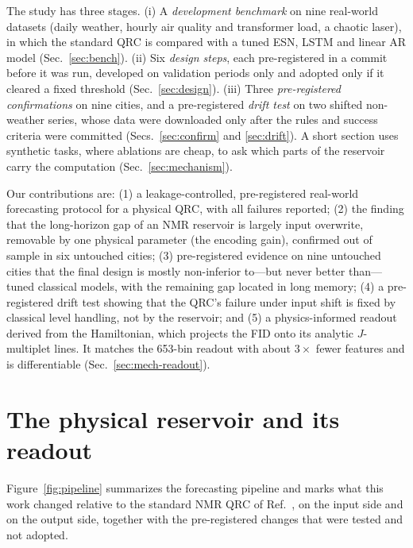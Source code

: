 \documentclass[aps,prresearch,preprint,superscriptaddress,amsmath,amssymb,floatfix]{revtex4-2}
\begin{document}
The study has three stages. (i) A \emph{development benchmark} on nine real-world
datasets (daily weather, hourly air quality and transformer load, a chaotic laser),
in which the standard QRC is compared with a tuned ESN, LSTM and linear AR model
(Sec.~\ref{sec:bench}). (ii) Six \emph{design steps}, each pre-registered in a
commit before it was run, developed on validation periods only and adopted only if it
cleared a fixed threshold (Sec.~\ref{sec:design}). (iii) Three \emph{pre-registered
confirmations} on nine cities, and a pre-registered \emph{drift test} on two shifted
non-weather series, whose data were downloaded only after the rules and success
criteria were committed (Secs.~\ref{sec:confirm} and \ref{sec:drift}). A short
section uses synthetic tasks, where ablations are cheap, to ask which parts of the
reservoir carry the computation (Sec.~\ref{sec:mechanism}).

Our contributions are: (1) a leakage-controlled, pre-registered real-world
forecasting protocol for a physical QRC, with all failures reported; (2) the finding
that the long-horizon gap of an NMR reservoir is largely input overwrite, removable by
one physical parameter (the encoding gain), confirmed out of sample in six untouched
cities; (3) pre-registered evidence on nine untouched cities that the final design is
mostly non-inferior to---but never better than---tuned classical models, with the
remaining gap located in long memory; (4) a pre-registered drift test showing
that the QRC's failure under input shift is fixed by classical level handling, not by
the reservoir; and (5) a physics-informed readout derived from the Hamiltonian, which
projects the FID onto its analytic $J$-multiplet lines. It matches the 653-bin readout
with about $3\times$ fewer features and is differentiable
(Sec.~\ref{sec:mech-readout}).

\section{The physical reservoir and its readout}\label{sec:model}
Figure~\ref{fig:pipeline} summarizes the forecasting pipeline and marks what this work
changed relative to the standard NMR QRC of Ref.~\cite{Hou2026}, on the input side and
on the output side, together with the pre-registered changes that were tested and not
adopted.
\end{document}
